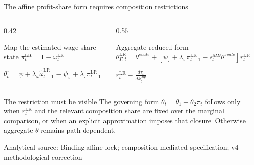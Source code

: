 \documentclass[10pt,aspectratio=169]{beamer}
\newcommand{\LR}{\mathrm{LR}}
\newcommand{\sourcefooter}[1]{%
  \par\vfill{\tiny\color{gray!70}Analytical source: #1}\vspace{-0.35em}}
\begin{document}
\begin{frame}{The affine profit-share form requires composition restrictions}
  \begin{columns}[T,onlytextwidth]
    \begin{column}{0.42\textwidth}
      \begin{block}{Map the estimated wage-share state}
        \centering
        $\displaystyle \pi_t^{\LR}=1-\omega_t^{\LR}$

        \vspace{0.5em}
        $\displaystyle
        \theta_t^{\tau}
        =\psi+\lambda_\omega\widetilde\omega_{t-1}^{\LR}
        \equiv\psi_\pi+\lambda_\pi\pi_{t-1}^{\LR}$
      \end{block}
    \end{column}
    \begin{column}{0.55\textwidth}
      \begin{block}{Aggregate reduced form}
        \centering
        \small
        $\displaystyle
        \theta_{\Gamma,t}^{\LR}
        =\theta^{scale}
        +\left[
          \psi_\pi+\lambda_\pi\pi_{t-1}^{\LR}
          -s_t^{ME}\theta^{scale}
        \right]r_t^{\LR}$

        \vspace{0.45em}
        $\displaystyle
        r_t^{\LR}\equiv\frac{d\tau_t}{d k_t^{cap}}$
      \end{block}
    \end{column}
  \end{columns}
  \begin{alertblock}{The restriction must be visible}
    The governing form $\theta_t=\theta_1+\theta_2\pi_t$ follows only when $r_t^{\LR}$ and the relevant composition share are fixed over the marginal comparison, or when an explicit approximation imposes that closure. Otherwise aggregate $\theta$ remains path-dependent.
  \end{alertblock}
  \sourcefooter{Binding affine lock; composition-mediated specification; v4 methodological correction}
\end{frame}
\end{document}
